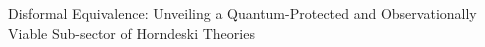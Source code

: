 \documentclass[twocolumn]{aastex631}
\begin{document}
Disformal Equivalence: Unveiling a Quantum-Protected and Observationally Viable Sub-sector of Horndeski Theories
\end{document}
